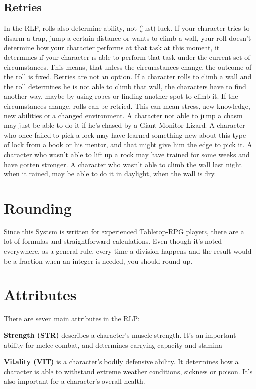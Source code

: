 \subsection{Retries}
In the RLP, rolls also determine ability, not (just) luck. If your character tries to disarm a trap, jump a certain distance or wants to climb a wall, your roll doesn’t determine how your character performs at that task at this moment, it determines if your character is able to perform that task under the current set of circumstances. This means, that unless the circumstances change, the outcome of the roll is fixed. Retries are not an option. If a character rolls to climb a wall and the roll determines he is not able to climb that wall, the characters have to find another way, maybe by using ropes or finding another spot to climb it.
If the circumstances change, rolls can be retried. This can mean stress, new knowledge, new abilities or a changed environment.
A character not able to jump a chasm may just be able to do it if he’s chased by a Giant Monitor Lizard.
A character who once failed to pick a lock may have learned something new about this type of lock from a book or his mentor, and that might give him the edge to pick it.
A character who wasn’t able to lift up a rock may have trained for some weeks and have gotten stronger.
A character who wasn’t able to climb the wall last night when it rained, may be able to do it in daylight, when the wall is dry.

\section{Rounding}
Since this System is written for experienced Tabletop-RPG players, there are a lot of formulas and straightforward calculations. Even though it’s noted everywhere, as a general rule, every time a division happens and the result would be a fraction when an integer is needed, you should round up.

\section{Attributes}
There are seven main attributes in the RLP:


\textbf{Strength (STR)} describes a character’s muscle strength. It’s an important ability for melee combat, and determines carrying capacity and stamina


\textbf{Vitality (VIT)} is a character’s bodily defensive ability. It determines how a character is able to withstand extreme weather conditions, sickness or poison. It’s also important for a character’s overall health.


